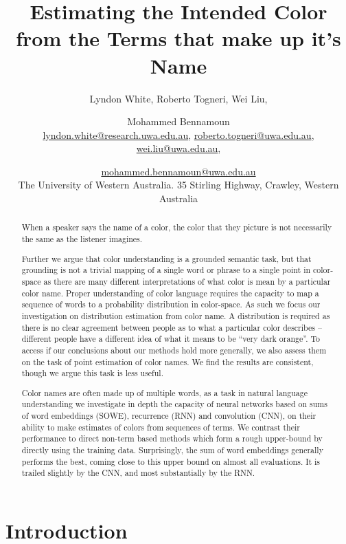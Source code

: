 \documentclass[11pt,a4paper]{article}
\title{Estimating the Intended Color from the Terms that make up it's Name}
\author{Lyndon White, %
	Roberto Togneri, %
	Wei Liu, %
	\and Mohammed Bennamoun%
	\\ 
	\url{lyndon.white@research.uwa.edu.au}, %
	\url{roberto.togneri@uwa.edu.au},\\
	\url{wei.liu@uwa.edu.au}, %
	\and \url{mohammed.bennamoun@uwa.edu.au}%
	\\
	The University of Western Australia.
	35 Stirling Highway, Crawley, Western Australia
}
\begin{document}
\maketitle

\begin{abstract}
When a speaker says the name of a color, the color that they picture is not necessarily the same as the listener imagines.

Further we argue that color understanding is a grounded semantic task, but that grounding is not a trivial mapping of a single word or phrase to a single point in color-space as there are many different interpretations of what  color is mean by a particular color name.
Proper understanding of color language requires the capacity to map a sequence of words to a probability distribution in color-space.
As such we focus our investigation on distribution estimation from color name.
A distribution is required as there is no clear agreement between people as to what a particular color describes -- different people have a different idea of what it means to be ``very dark orange''.
To access if our conclusions about our methods hold more generally, we also assess them on the task of point estimation of color names.
We find the results are consistent, though we argue this task is less useful.

Color names are often made up of multiple words,
as a task in natural language understanding we investigate in depth the capacity of neural networks based on sums of word embeddings (SOWE), recurrence (RNN) and convolution (CNN),  on their ability to make estimates of colors from sequences of terms.
We contrast their performance to direct non-term based methods which form a rough upper-bound by directly using the training data.
Surprisingly, the sum of word embeddings generally performs the best, coming close to this upper bound on almost all evaluations.
It is trailed slightly by the CNN, and most substantially by the RNN.
\end{abstract}

\section{Introduction}\label{sec:intro}
\end{document}
